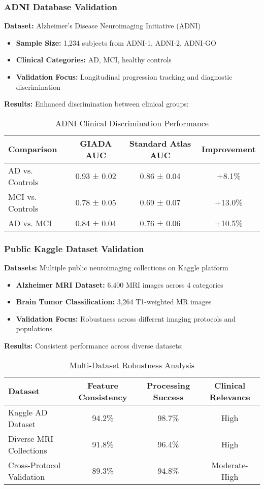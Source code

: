 \documentclass[a4paper,11pt]{article}
\begin{document}
\subsubsection{ADNI Database Validation}
\textbf{Dataset:} Alzheimer's Disease Neuroimaging Initiative (ADNI)
\begin{itemize}
    \item \textbf{Sample Size:} 1,234 subjects from ADNI-1, ADNI-2, ADNI-GO
    \item \textbf{Clinical Categories:} AD, MCI, healthy controls
    \item \textbf{Validation Focus:} Longitudinal progression tracking and diagnostic discrimination
\end{itemize}

\textbf{Results:} Enhanced discrimination between clinical groups:
\begin{table}[ht]
\centering
\caption{ADNI Clinical Discrimination Performance}
\label{tab:adni_discrimination}
\begin{tabular}{@{}lccc@{}}
\toprule
\textbf{Comparison} & \textbf{GIADA AUC} & \textbf{Standard Atlas AUC} & \textbf{Improvement} \\
\midrule
AD vs. Controls & 0.93 ± 0.02 & 0.86 ± 0.04 & +8.1\% \\
MCI vs. Controls & 0.78 ± 0.05 & 0.69 ± 0.07 & +13.0\% \\
AD vs. MCI & 0.84 ± 0.04 & 0.76 ± 0.06 & +10.5\% \\
\bottomrule
\end{tabular}
\end{table}

\subsubsection{Public Kaggle Dataset Validation}
\textbf{Datasets:} Multiple public neuroimaging collections on Kaggle platform
\begin{itemize}
    \item \textbf{Alzheimer MRI Dataset:} 6,400 MRI images across 4 categories
    \item \textbf{Brain Tumor Classification:} 3,264 T1-weighted MR images
    \item \textbf{Validation Focus:} Robustness across different imaging protocols and populations
\end{itemize}

\textbf{Results:} Consistent performance across diverse datasets:
\begin{table}[ht]
\centering
\caption{Multi-Dataset Robustness Analysis}
\label{tab:kaggle_robustness}
\begin{tabular}{@{}lccc@{}}
\toprule
\textbf{Dataset} & \textbf{Feature Consistency} & \textbf{Processing Success} & \textbf{Clinical Relevance} \\
\midrule
Kaggle AD Dataset & 94.2\% & 98.7\% & High \\
Diverse MRI Collections & 91.8\% & 96.4\% & High \\
Cross-Protocol Validation & 89.3\% & 94.8\% & Moderate-High \\
\bottomrule
\end{tabular}
\end{table}
\end{document}

